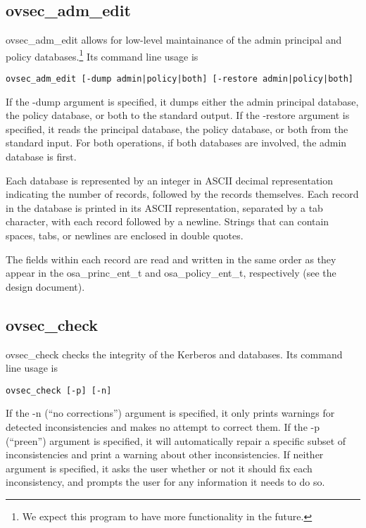 \subsection{ovsec_adm_edit}

ovsec_adm_edit allows for low-level maintainance of the admin
principal and policy da\-ta\-ba\-ses.\footnote{We expect this program to
have more functionality in the future.} Its command line usage is

\begin{verbatim}
ovsec_adm_edit [-dump admin|policy|both] [-restore admin|policy|both]
\end{verbatim}

If the -dump argument is specified, it dumps either the admin
principal database, the policy database, or both to the standard
output.  If the -restore argument is specified, it reads the principal
database, the policy database, or both from the standard input.  For
both operations, if both databases are involved, the admin database is
first.

Each database is represented by an integer in ASCII decimal
representation indicating the number of records, followed by the
records themselves.  Each record in the database is printed in its
ASCII representation, separated by a tab character, with each record
followed by a newline.  Strings that can contain spaces, tabs, or
newlines are enclosed in double quotes.

The fields within each record are read and written in the same order
as they appear in the osa_princ_ent_t and osa_policy_ent_t,
respectively (see the design document).

\subsection{ovsec_check}

ovsec_check checks the integrity of the Kerberos and \secure{}
databases.  Its command line usage is

\begin{verbatim}
ovsec_check [-p] [-n]
\end{verbatim}

If the -n (``no corrections'') argument is specified, it only prints
warnings for detected inconsistencies and makes no attempt to correct
them.  If the -p (``preen'') argument is specified, it will
automatically repair a specific subset of inconsistencies and print a
warning about other inconsistencies.  If neither argument is
specified, it asks the user whether or not it should fix each
inconsistency, and prompts the user for any information it needs to do
so.

